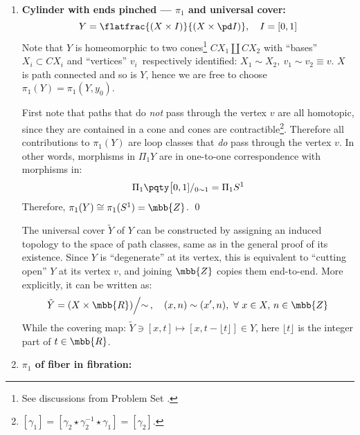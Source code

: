 \documentclass[a4paper,10pt]{article}
\begin{document}
\begin{enumerate}
	\item \textbf{Cylinder with ends pinched --- $\pi_1$ and universal cover:}
	\begin{equation}
		Y = \flatfrac{(X\times I)}{(X\times \pd I)},
		\quad I = [0,1]
	\end{equation}
	Note that $Y$ is homeomorphic to two cones\footnote{
		See discussions from Problem Set . 
	} $CX_1\coprod CX_2$ with ``bases'' $X_i\subset CX_i$ and ``vertices'' $v_i$~respectively identified: $X_1\sim X_2,\ v_1\sim v_2\equiv v$. $X$ is path connected and so is $Y$, hence we are free to choose $\pi_1(Y) = \pi_1(Y,y_0)$. 
	
	First note that paths that do \textit{not} pass through the vertex $v$ are all homotopic, since they are contained in a cone and cones are contractible\footnote{
		$[\gamma_1]
		= [\gamma_2\star\gamma_2^{-1}\star\gamma_1]
		= [\gamma_2]$. 
	}. Therefore all contributions to $\pi_1(Y)$ are loop classes that \textit{do} pass through the vertex $v$. 
	In other words, morphisms in $\Pi_1 Y$ are in one-to-one correspondence with morphisms in:
	\begin{equation}
		\Pi_1\pqty\big{[0,1]/_{0\sim 1}} = \Pi_1 S^1
	\end{equation}
	Therefore, $\pi_1(Y) \cong \pi_1(S^1) = \mbb{Z}$. 
	\qed
	
	The universal cover $\tilde{Y}$ of $Y$ can be constructed by assigning an induced topology to the space of path classes, same as in the general proof of its existence. Since $Y$ is ``degenerate'' at its vertex, this is equivalent to ``cutting open'' $Y$ at its vertex $v$, and joining $\mbb{Z}$ copies them end-to-end. More explicitly, it can be written as:
	\begin{equation}
		\tilde{Y} = {(X\times \mbb{R})}\Big/{
			\sim
		}\,,\quad
		(x,n)\sim (x',n),\ \forall\ 
			x\in X,\,n\in\mbb{Z}
	\end{equation}
	While the covering map: $\tilde{Y}\ni[x,t]\mapsto [x,t-\lfloor t\rfloor]\in Y$, here $\lfloor t\rfloor$ is the integer part of $t\in\mbb{R}$. 
	\qedfull
	
	\item \textbf{$\pi_1$ of fiber in fibration:}
	\label{item:fibration_fundamental}
	\begin{center}
	\end{center}
	

\end{enumerate}
\end{document}
